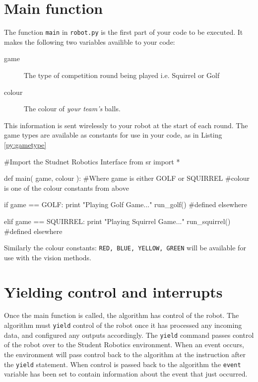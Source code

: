 \documentclass[a4paper, 12pt]{article}
\begin{document}
\section{Main function}
The function \texttt{main} in \texttt{robot.py} is the first part of your code to be executed. It makes the following two variables availible to your code:
\begin{description}
\item[game] The type of competition round being played i.e. Squirrel or Golf
\item[colour]The colour of \textit{your team's} balls.
\end{description}

This information is sent wirelessly to your robot at the start of each round. The game types are available as constants for use in your code, as in Listing \ref{py:gametype}
\begin{python}
\begin{verbatimtab}
#Import the Studnet Robotics Interface	
from sr import * 

def main( game, colour ):
        #Where game is either GOLF or SQUIRREL
        #colour is one of the colour constants from above

	if game == GOLF:
		print "Playing Golf Game..."
		run_golf()	#defined elsewhere

	elif game == SQUIRREL:
		print "Playing Squirrel Game..."
		run_squirrel()	#defined elsewhere
\end{verbatimtab}
  \caption{\label{py:gametype}} 
\end{python}

Similarly the colour constants: \texttt{RED, BLUE, YELLOW, GREEN} will be available for use with the vision methods.


\section{Yielding control and interrupts}
Once the main function is called, the algorithm has control of the robot.  The
algorithm must \texttt{yield} control of the robot once it has
processed any incoming data, and configured any outputs accordingly.
The \texttt{yield} command passes control of the robot over to the
Student Robotics environment. When an event occurs, the environment will pass
control back to the algorithm at the instruction after the \texttt{yield}
statement.  When control is passed back to the
algorithm the \texttt{event} variable has been set to contain information
about the event that just occurred.
\end{document}
